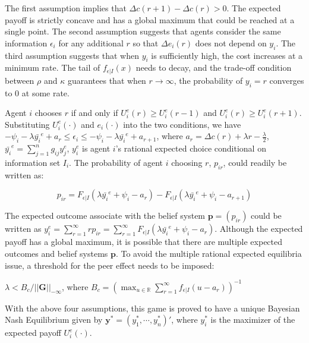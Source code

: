 The first assumption implies that $\Delta c(r+1)-\Delta c(r)>0$. The expected payoff is  strictly concave and has a global maximum that could be reached at a single point. The second assumption suggests that agents consider the same information $\epsilon_i$ for any additional $r$ so that $\Delta e_i(r)$ does not depend on $y_i$. The third assumption suggests that when $y_i$ is sufficiently high, the cost increases at a minimum rate. The tail of $f_{\epsilon|I}(x)$ needs to decay, and the trade-off condition between $\rho$ and $\kappa$ guarantees that when $r\rightarrow\infty$, the probability of $y_i=r$ converges to $0$ at some rate.

Agent $i$ chooses $r$ if and only if $U_i^e\left(r\right) \geq U_i^e\left(r-1\right)$ and $U_i^e\left(r\right) \geq U_i^e\left(r+1\right)$. Substituting $U_i^e\left(\cdot\right)$ and $e_i\left(\cdot\right)$ into the two conditions, we have $-\psi_i-\lambda\bar{y_i}^e+a_r \leq \epsilon_i \leq -\psi_i-\lambda\bar{y_i}^e+a_{r+1}$, where $a_r=\Delta c(r)+\lambda r-\frac{\lambda}{2}$, $\bar{y_i}^e=\sum_{j=1}^n g_{ij}y_j^e$, $y_i^e$ is agent $i$'s rational expected choice conditional on information set $I_i$. The probability of agent $i$ choosing $r$, $p_{ir}$, could readily be written as:

\begin{equation}
    \nonumber
    p_{ir} = F_{\epsilon|I}\left( \lambda\bar{y_i}^e + \psi_i - a_r \right) - F_{\epsilon|I}\left( \lambda\bar{y_i}^e + \psi_i - a_{r+1} \right)
\end{equation}

The expected outcome associate with the belief system $\mathbf{p}=(p_{ir})$ could be written as $y_i^e=\sum_{r=1}^\infty rp_{ir}=\sum_{r=1}^\infty F_{\epsilon|I}\left( \lambda\bar{y_i}^e + \psi_i - a_r \right)$. Although the expected payoff has a global maximum, it is possible that there are multiple expected outcomes and belief systems $\mathbf{p}$. To avoid the multiple rational expected equilibria issue, a threshold for the peer effect needs to be imposed:

\begin{assumption}
  $\lambda < B_c/\vert\vert\mathbf{G}\vert\vert_{-\infty}$, where $B_c= \left( \max_{u\in\mathbb{R}} \sum_{r=1}^\infty f_{\epsilon|I}\left(u-a_r\right) \right)^{-1}$
\end{assumption}

With the above four assumptions, this game is proved to have a unique Bayesian Nash Equilibrium given by $\mathbf{y^*}=(y_1^*,\cdots,y_n^*)'$, where $y_i^*$ is the maximizer of the expected payoff $U_i^e\left(\cdot\right)$. 

